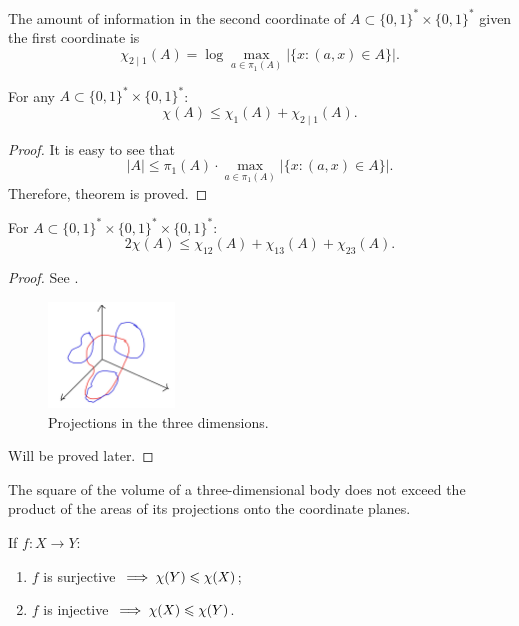 \begin{definition}
    The amount of information in the second coordinate of $A \subset \{0, 1\}^* \times \{0, 1\}^*$ given the first coordinate is
    \[\chi_{2 \mid 1}(A) = \log \max_{a \in \pi_1(A)} |\{x \colon (a, x) \in A\}|.\]
\end{definition}

\begin{theorem}
    For any $A \subset \{0, 1\}^* \times \{0, 1\}^*$:
    \[
        \chi(A) \leq \chi_1(A) + \chi_{2 \mid 1}(A).
    \]
\end{theorem}
\begin{proof}
    It is easy to see that
    \[|A| \leq \pi_1(A) \cdot \max_{a \in \pi_1(A)} |\{x \colon (a, x) \in A\}|.\]
    Therefore, theorem is proved.
\end{proof}

\begin{theorem}
    For $A \subset \{0, 1\}^* \times \{0, 1\}^* \times \{0, 1\}^*$:
    \[
        2 \chi(A) \leq \chi_{12}(A) + \chi_{13}(A) + \chi_{23}(A).
    \]
\end{theorem}
\begin{proof}
    See .
    \begin{figure}[H]
        \centering
        \includegraphics[width=0.3\textwidth]{figures/B7BA098F-7336-4321-BCCD-FC1F6F1419D6}
        \caption{Projections in the three dimensions.}
        \label{fig:b7ba098f-7336-4321-bccd-fc1f6f1419d6}
    \end{figure}

    Will be proved later.
\end{proof}

\begin{corollary}
    The square of the volume of a three-dimensional body does not exceed the product of the areas of its projections onto the coordinate planes.
\end{corollary}

\begin{statement}
    If $f \colon X \to Y$:
    \begin{enumerate}
        \item $f$ is surjective $\implies \chi(Y) \leqslant \chi(X)$;
        \item $f$ is injective $\implies \chi(X) \leqslant \chi(Y)$.
    \end{enumerate}
\end{statement}

